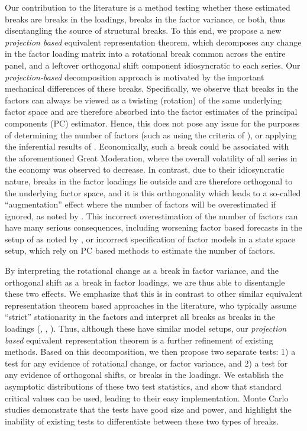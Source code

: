 \documentclass[12pt]{article}
\renewcommand{\marginnote}[2][]{}
\theoremstyle{plain}
\numberwithin{equation}{section}
\begin{document}
\marginnote[Added in clearer contribution, emphasizing that we need an (estimated) break fraction. Suggestion made by some people, particularly Fabio]{right}
Our contribution to the literature is a method testing whether these estimated breaks are breaks in the loadings, breaks in the factor variance, or both, thus disentangling the source of structural breaks. To this end, we propose a new \emph{projection based} equivalent representation theorem, which decomposes any change in the factor loading matrix into a rotational break common across the entire panel, and a leftover orthogonal shift component idiosyncratic to each series. Our \emph{projection-based} decomposition approach is motivated by the important mechanical differences of these breaks. Specifically, we observe that breaks in the factors can always be viewed as a twisting (rotation) of the same underlying factor space and are therefore absorbed into the factor estimates of the principal components (PC) estimator. Hence, this does not pose any issue for the purposes of determining the number of factors (such as using the criteria of \textcite{bai_determining_2002}), or applying the inferential results of \textcite{bai_inferential_2003}. Economically, such a break could be associated with the aforementioned Great Moderation, where the overall volatility of all series in the economy was observed to decrease. In contrast, due to their idiosyncratic nature, breaks in the factor loadings lie outside and are therefore orthogonal to the underlying factor space, and it is this orthogonality which leads to a so-called ``augmentation'' effect where the number of factors will be overestimated if ignored, as noted by \textcite{breitung_testing_2011}. This incorrect overestimation of the number of factors can have many serious consequences, including worsening factor based forecasts in the setup of \textcite{stock_forecasting_2002} as noted by \textcite{baltagi_estimating_2021}, or incorrect specification of factor models in a state space setup, which rely on PC based methods to estimate the number of factors. 

By interpreting the rotational change as a break in factor variance, and the orthogonal shift as a break in factor loadings, we are thus able to disentangle these two effects. We emphasize that this is in contrast to other similar equivalent representation theorem based approaches in the literature, who typically assume ``strict'' stationarity in the factors and interpret all breaks as breaks in the loadings (\textcite{chen_detecting_2014}, \textcite{han_tests_2015}, \textcite{baltagi_identification_2017}). Thus, although these have similar model setups, our \emph{projection based} equivalent representation theorem is a further refinement of existing methods. Based on this decomposition, we then propose two separate tests: 1) a test for any evidence of rotational change, or factor variance, and 2) a test for any evidence of orthogonal shifts, or breaks in the loadings. We establish the asymptotic distributions of these two test statistics, and show that standard critical values can be used, leading to their easy implementation. Monte Carlo studies demonstrate that the tests have good size and power, and highlight the inability of existing tests to differentiate between these two types of breaks. 
\end{document}
